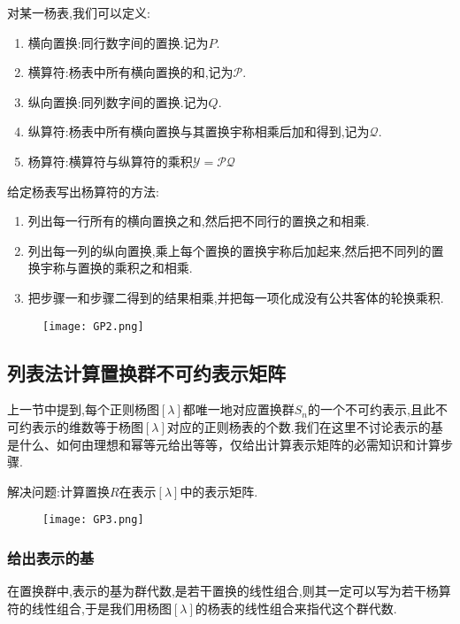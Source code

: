\documentclass{ctexart}
\begin{document}
对某一杨表,我们可以定义:
\begin{enumerate}
    \item 横向置换:同行数字间的置换.记为$P$.
    \item 横算符:杨表中所有横向置换的和,记为$\mathcal{P}$.
    \item 纵向置换:同列数字间的置换.记为$Q$.
    \item 纵算符:杨表中所有横向置换与其置换宇称相乘后加和得到,记为$\mathcal{Q}$.
    \item 杨算符:横算符与纵算符的乘积$\mathcal{Y}=\mathcal{PQ}$
\end{enumerate}

给定杨表写出杨算符的方法:
\begin{enumerate}
    \item 列出每一行所有的横向置换之和,然后把不同行的置换之和相乘.
    \item 列出每一列的纵向置换,乘上每个置换的置换宇称后加起来,然后把不同列的置换宇称与置换的乘积之和相乘.
    \item 把步骤一和步骤二得到的结果相乘,并把每一项化成没有公共客体的轮换乘积.
\end{enumerate}
\begin{figure}[H]
    \centering
    \texttt{[image: GP2.png]}
\end{figure}

\subsection{列表法计算置换群不可约表示矩阵}

上一节中提到,每个正则杨图$[\lambda]$都唯一地对应置换群$S_{n}$的一个不可约表示,且此不可约表示的维数等于杨图$[\lambda]$对应的正则杨表的个数.我们在这里不讨论表示的基是什么、如何由理想和幂等元给出等等，仅给出计算表示矩阵的必需知识和计算步骤.

解决问题:计算置换$R$在表示$[\lambda]$中的表示矩阵.

\begin{figure}[H]
    \centering
    \texttt{[image: GP3.png]}
\end{figure}

\subsubsection{给出表示的基}

在置换群中,表示的基为群代数,是若干置换的线性组合,则其一定可以写为若干杨算符的线性组合,于是我们用杨图$[\lambda]$的杨表的线性组合来指代这个群代数.
\end{document}
